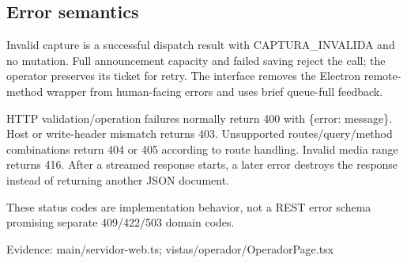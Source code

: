 \subsection{Error semantics}

Invalid capture is a successful dispatch result with CAPTURA\_INVALIDA and no mutation. Full announcement capacity and failed saving reject the call; the operator preserves its ticket for retry. The interface removes the Electron remote-method wrapper from human-facing errors and uses brief queue-full feedback.

HTTP validation/operation failures normally return 400 with \{error: message\}. Host or write-header mismatch returns 403. Unsupported routes/query/method combinations return 404 or 405 according to route handling. Invalid media range returns 416. After a streamed response starts, a later error destroys the response instead of returning another JSON document.

These status codes are implementation behavior, not a REST error schema promising separate 409/422/503 domain codes.

Evidence: main/servidor-web.ts; vistas/operador/OperadorPage.tsx
